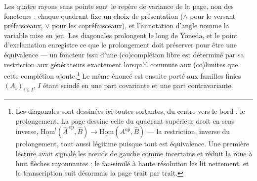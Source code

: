 \documentclass[11pt,a4paper]{article}
\begin{document}

Les quatre rayons sans pointe sont le repère de variance de la page, non
des foncteurs : chaque quadrant fixe un choix de présentation
($\wedge$ pour le versant préfaisceaux, $\vee$ pour les copréfaisceaux), et
l'annotation d'angle nomme la variable mise en jeu. Les diagonales
prolongent le long de Yoneda, et le point d'exclamation enregistre ce que le
prolongement doit préserver pour être une équivalence — un foncteur issu
d'une (co)complétion libre est déterminé par sa restriction aux générateurs
exactement lorsqu'il commute aux (co)limites que cette complétion
ajoute.\footnote{Les diagonales sont dessinées ici toutes sortantes, du
centre vers le bord : le prolongement. La page dessine celle du quadrant
supérieur droit en sens inverse,
$\underline{\mathrm{Hom}}^{!}(\widehat{A}^{\,\mathrm{op}},\widehat{B}) \to
\underline{\mathrm{Hom}}(A^{\mathrm{op}},\widehat{B})$ — la restriction,
inverse du prolongement, tout aussi légitime puisque tout est équivalence.
Une première lecture avait signalé les nœuds de gauche comme incertains et
réduit la roue à huit flèches rayonnantes ; le fac-similé à haute résolution
les lit nettement, et la transcription suit désormais la page trait par
trait.} Le même énoncé est ensuite
porté aux familles finies $(A_{i})_{i \in I}$, $I$ étant scindé en une part
covariante et une part contravariante.
\end{document}
